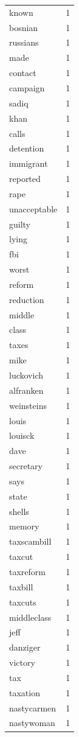 \begin{tabular}{lr}
known & 1 \\
bosnian & 1 \\
russians & 1 \\
made & 1 \\
contact & 1 \\
campaign & 1 \\
sadiq & 1 \\
khan & 1 \\
calls & 1 \\
detention & 1 \\
immigrant & 1 \\
reported & 1 \\
rape & 1 \\
unacceptable & 1 \\
guilty & 1 \\
lying & 1 \\
fbi & 1 \\
worst & 1 \\
reform & 1 \\
reduction & 1 \\
middle & 1 \\
class & 1 \\
taxes & 1 \\
mike & 1 \\
luckovich & 1 \\
alfranken & 1 \\
weinsteins & 1 \\
louis & 1 \\
louisck & 1 \\
dave & 1 \\
secretary & 1 \\
says & 1 \\
state & 1 \\
shells & 1 \\
memory & 1 \\
taxscambill & 1 \\
taxcut & 1 \\
taxreform & 1 \\
taxbill & 1 \\
taxcuts & 1 \\
middleclass & 1 \\
jeff & 1 \\
danziger & 1 \\
victory & 1 \\
tax & 1 \\
taxation & 1 \\
nastycarmen & 1 \\
nastywoman & 1 \\

\end{tabular}
